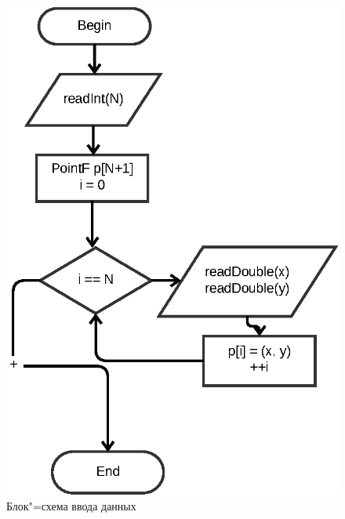 \documentclass[a4paper,12pt,notitlepage,headsepline,pdftex]{scrartcl}
\begin{document}
\begin{figure}[h]
  \begin{center}
    \includegraphics{input.eps}
  \end{center}
  \caption{Блок"=схема ввода данных}
  \label{fig:input}
\end{figure}
\end{document}
